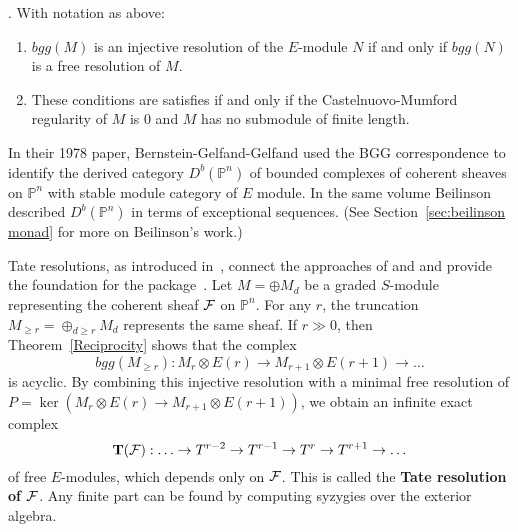 \documentclass[twoside,12pt, leqno]{amsart}
\def\PP{{\mathbb P}}
\def\bT{{\bf T}}
\def\CU{{\mathcal U}}
\def\daniel#1{{\bf *** Daniel:} #1 {\bf ***}}
\begin{document}
\begin{theorem}[Reciprocity] \cite[Theorem 3.7 and Corollary 2.4] {EFS}\label{Reciprocity}. With notation as above:
\begin{enumerate}
 \item $bgg(M)$ is an injective resolution of the $E$-module $N$ if and only if
$bgg(N)$ is a free resolution of $M$.

\item These conditions are satisfies if and only if the Castelnuovo-Mumford regularity of $M$ is 0 and $M$ has no submodule of finite length.
\end{enumerate}
\end{theorem}


In their 1978 paper, Bernstein-Gelfand-Gelfand \cite{BGG} used the BGG correspondence to identify  the derived category $D^b(\PP^n)$ of bounded complexes of coherent sheaves on $\PP^n$ with stable module category of $E$ module. In the same volume \cite{beilinson} Beilinson  described
$D^b(\PP^n)$ in terms of exceptional sequences.  (See Section~\ref{sec:beilinson monad} for more on Beilinson's work.)


Tate resolutions, as introduced in~\cite{EFS}, connect the approaches of \cite{BGG} and \cite{beilinson} and provide the foundation for the package~\cite{M2BGG}.
Let $M=\oplus M_d$ be a graded $S$-module representing the coherent sheaf ${\mathcal F}$ on $\PP^n$. For any $r$, the truncation $M_{\ge r} = \oplus_{d \ge r}M_d$ represents the same sheaf.  If $r\gg 0$, then Theorem~\ref{Reciprocity} shows that the  complex
$$
bgg(M_{\ge r}) : M_r\otimes E(r) \to M_{r+1}\otimes E(r+1) \to \ldots
$$ 
is acyclic. By combining this injective resolution with a minimal free resolution of $P=\ker(M_r\otimes E(r) \to M_{r+1}\otimes E(r+1))$, we obtain an infinite exact complex
$$
\bT(\sF):   \ldots \to T^{r-2} \to T^{r-1} \to T^r \to T^{r+1} \to \ldots
$$
of free $E$-modules, which depends only on ${\mathcal F}$.  This is called the {\bf Tate resolution of ${\mathcal F}$}. Any finite part can be found by computing syzygies over the exterior algebra.
\end{document}

